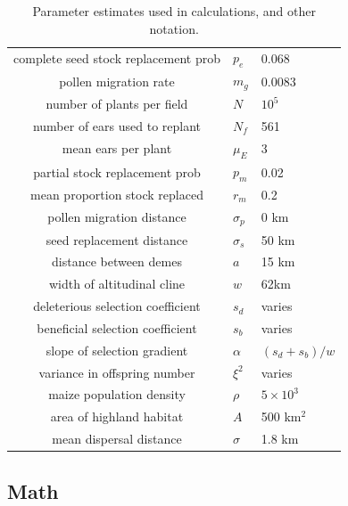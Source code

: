 \begin{table}[htb!!]
  \begin{center}
  \begin{tabular}{|cll|}
    \hline
    complete seed stock replacement prob & $p_e$     & 0.068 \\
    pollen migration rate                & $m_g$      & 0.0083 \\
    number of plants per field           & $N$        & $10^5$ \\
    number of ears used to replant       & $N_f$      & 561 \\
    mean ears per plant                  & $\mu_E$    & 3 \\
    partial stock replacement prob       & $p_m$      & 0.02 \\
    mean proportion stock replaced       & $r_m$      & 0.2 \\
    pollen migration distance            & $\sigma_p$ & 0 km \\
    seed replacement distance            & $\sigma_s$ & 50 km \\
    distance between demes               & $a$        & 15 km \\
    width of altitudinal cline           & $w$        & 62km \\
    deleterious selection coefficient    & $s_d$      & varies \\
    beneficial selection coefficient     & $s_b$      & varies \\
    slope of selection gradient          & $\alpha$   & $(s_d+s_b)/w$ \\
    variance in offspring number         & $\xi^2$    & varies \\
    maize population density             & $\rho$     & $5 \times 10^3$ \\
    area of highland habitat             & $A$        & 500 km$^2$ \\
    mean dispersal distance              & $\sigma$   & 1.8 km \\
    \hline 
  \end{tabular}
\end{center}
  \caption{Parameter estimates used in calculations, and other notation.
  \label{tab:parameters}
  }
\end{table}


\subsection{Math}

